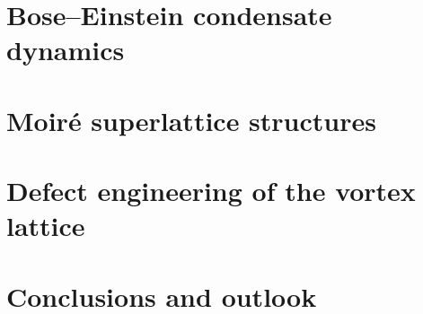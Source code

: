 \documentclass[12pt, oneside]{book} %
\newcommand{\numberedchapter}[1]{ %
	\cleardoublepage %
    \chapter{#1}
	\lhead{\bfseries \leftmark}
}%
\begin{document}
\fi
\newif\ifvtxdyn
\vtxdyntrue
\ifvtxdyn
    \numberedchapter{Bose--Einstein condensate dynamics}\label{sec:vortlatt}
        
    \fi
\newif\ifmoire
\moiretrue
\ifmoire
    \numberedchapter{Moir\'e superlattice structures}
        
\fi
\newif\ifdefect
\defecttrue
\ifdefect
    \numberedchapter{Defect engineering of the vortex lattice}
        

\fi

\newif\ifconc
\conctrue
\ifconc
    \numberedchapter{Conclusions and outlook} %
\fi

%
%
%

\end{document}
